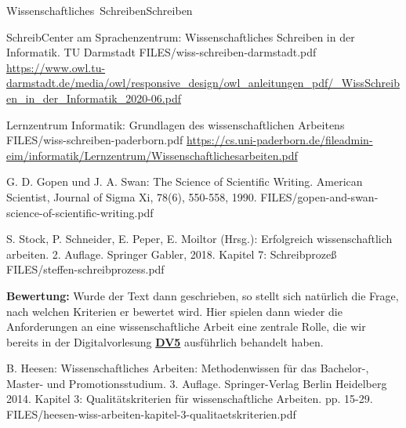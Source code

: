 



\unit{Wissenschaftliches Schreiben}{Schreiben}


{SchreibCenter am Sprachenzentrum: Wissenschaftliches Schreiben in der Informatik. 
TU Darmstadt}
{FILES/wiss-schreiben-darmstadt.pdf}
{\href{https://www.owl.tu-darmstadt.de/media/owl/responsive\_design/owl\_anleitungen\_pdf/0036\_WissSchreiben\_in\_der\_Informatik\_2020-06.pdf}{https://www.owl.tu-darmstadt.de/media/owl/responsive\_\allowbreak\relax design/owl\_anleitungen\_pdf/\_WissSchreiben\_in\_der\_Informatik\_2020-06.pdf}}



{Lernzentrum Informatik: Grundlagen des wissenschaftlichen Arbeitens}
{FILES/wiss-schreiben-paderborn.pdf}
{\href{https://cs.uni-paderborn.de/fileadmin-eim/informatik/Lernzentrum/Wissenschaftlichesarbeiten.pdf}{https://cs.uni-paderborn.de/file\allowbreak\relax admin-eim/informatik/Lernzentrum/Wissenschaftlichesarbeiten.pdf}
}




{G. D. Gopen und J. A. Swan: The Science of Scientific Writing. American Scientist, 
Journal of Sigma Xi, 78(6), 550-558, 1990.}
{FILES/gopen-and-swan-science-of-scientific-writing.pdf}
{}





{S. Stock, P. Schneider, E. Peper, E. Moiltor (Hrsg.): Erfolgreich
wissenschaftlich arbeiten. 2. Auflage. Springer Gabler, 2018.
Kapitel 7: Schreibprozeß}
{FILES/steffen-schreibprozess.pdf}
{}




\bigskip\bigskip
\textbf{Bewertung:} Wurde der Text dann geschrieben, so stellt sich natürlich die Frage,
nach welchen Kriterien er bewertet wird.
Hier spielen dann wieder die Anforderungen an eine wissenschaftliche Arbeit eine
zentrale Rolle, die wir bereits in der
Digitalvorlesung \hyperref[DV]{\bf DV5} ausführlich behandelt haben.




{B. Heesen: Wissenschaftliches Arbeiten: Methodenwissen für das Bachelor-, Master- und 
Promotionsstudium.
3. Auflage. Springer-Verlag Berlin Heidelberg 2014. 
Kapitel 3: Qualitätskriterien für wissenschaftliche Arbeiten.
pp. 15-29.}
{FILES/heesen-wiss-arbeiten-kapitel-3-qualitaetskriterien.pdf}
{}


